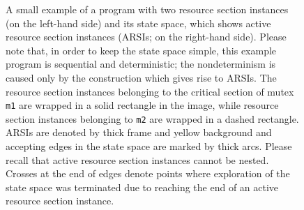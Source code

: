 \begin{figure}[t]
\caption{
    A small example of a program with two resource section instances (on the left-hand side) and its state space, which shows active resource section instances (ARSIs; on the right-hand side).
    Please note that, in order to keep the state space simple, this example program is sequential and deterministic; the nondeterminism is caused only by the construction which gives rise to ARSIs.
    The resource section instances belonging to the critical section of mutex \texttt{m1} are wrapped in a solid rectangle in the image, while resource section instances belonging to \texttt{m2} are wrapped in a dashed rectangle.
    ARSIs are denoted by thick frame and yellow background and accepting edges in the state space are marked by thick arcs.
    Please recall that active resource section instances cannot be nested.
    Crosses at the end of edges denote points where exploration of the state space was terminated due to reaching the end of an active resource section instance.
} \label{fig:active}
\end{figure}

